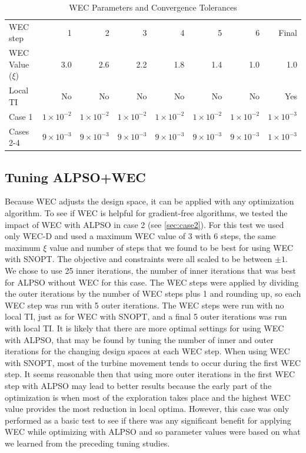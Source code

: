 \documentclass{jpconf}
\begin{document}
\begin{table}[h!]
	\centering
	\caption{WEC Parameters and Convergence Tolerances}
	\label{tab:wectols}
	\begin{tabular}{lrrrrrrr}
		\toprule		
	WEC step & 1 & 2 & 3 & 4 & 5 & 6 & Final \\
	\cmidrule{2-8}
	WEC Value ($\xi$) & 3.0 & 2.6 & 2.2 & 1.8 & 1.4 & 1.0 & 1.0 \\
	Local TI & No & No & No & No & No & No & Yes \\
	Case 1 &	$1\times10^{-2}$ & $1\times10^{-2}$ & $1\times10^{-2}$ & $1\times10^{-2}$ & $1\times10^{-2}$ & $1\times10^{-2}$ & $1\times10^{-3}$ \\
	Cases 2-4 &	$9\times10^{-3}$ & $9\times10^{-3}$ & $9\times10^{-3}$ & $9\times10^{-3}$ & $9\times10^{-3}$ & $9\times10^{-3}$ & $1\times10^{-3}$ \\
		\bottomrule
	\end{tabular}
\end{table}

\subsection{Tuning ALPSO+WEC}
Because WEC adjusts the design space, it can be applied with any optimization algorithm. To see if WEC is helpful for gradient-free algorithms, we tested the impact of WEC with ALPSO in case 2 (see \cref{sec:case2}). For this test we used only WEC-D and used a maximum WEC value of 3 with 6 steps, the same maximum $\xi$ value and number of steps that we found to be best for using WEC with SNOPT. The objective and constraints were all scaled to be between $\pm1$. We chose to use 25 inner iterations, the number of inner iterations that was best for ALPSO without WEC for this case. The WEC steps were applied by dividing the outer iterations by the number of WEC steps plus 1 and rounding up, so each WEC step was run with 5 outer iterations. The WEC steps were run with no local TI, just as for WEC with SNOPT, and a final 5 outer iterations was run with local TI. It is likely that there are more optimal settings for using WEC with ALPSO, that may be found by tuning the number of inner and outer iterations for the changing design spaces at each WEC step. When using WEC with SNOPT, most of the turbine movement tends to occur during the first WEC step. It seems reasonable then that using more outer iterations in the first WEC step with ALPSO may lead to better results because the early part of the optimization is when most of the exploration takes place and the highest WEC value provides the most reduction in local optima. However, this case was only performed as a basic test to see if there was any significant benefit for applying WEC while optimizing with ALPSO and so parameter values were based on what we learned from the preceding tuning studies.
\end{document}
